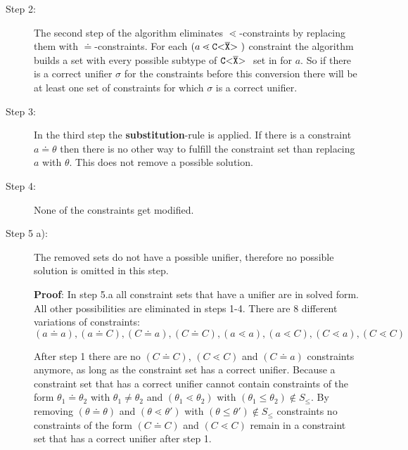\documentclass[acmsmall,screen,review]{acmart}
\begin{document}
\begin{description}
\item[Step 2:]
The second step of the algorithm eliminates $\lessdot$-constraints
by replacing them with $\doteq$-constraints.
For each $(a \lessdot \mathtt{C {\tt <} \overline{X} {\tt >} \ })$ constraint the algorithm builds a set with every
possible subtype of $\mathtt{C {\tt <} \overline{X} {\tt >} \ }$ set in for $a$.
So if there is a correct unifier $\sigma$ for the constraints before this conversion there will be at least one set of
constraints for which $\sigma$ is a correct unifier.

\item[Step 3:]
In the third step the \textbf{substitution}-rule is applied.
If there is a constraint $a \doteq \theta$ then there is no other way to fulfill the constraint set
than replacing $a$ with $\theta$.
This does not remove a possible solution.

\item[Step 4:]
None of the constraints get modified.

\item[Step 5 a):]
The removed sets do not have a possible unifier, therefore no possible solution is
omitted in this step.

\textbf{Proof}:
In step 5.a all constraint sets that have a unifier are in solved form.
All other possibilities are eliminated in steps 1-4.
There are 8 different variations of constraints:\\
$(a \doteq a), (a \doteq C), (C \doteq a), (C \doteq C), (a \lessdot a), (a \lessdot C), (C \lessdot a), (C \lessdot C)$

After step 1 there are no $(C \doteq C)$, $(C \lessdot C)$ and $(C \doteq a)$ constraints anymore,
as long as the constraint set has a correct unifier.
Because a constraint set that has a correct unifier cannot contain constraints of the form $\theta_1 \doteq \theta_2$ with $\theta_1 \neq \theta_2$ and
$(\theta_1 \lessdot \theta_2)$ with $(\theta_1 \leq \theta_2) \notin S_\leq$.
By removing $(\theta \doteq \theta)$ and $(\theta \lessdot \theta')$ with $(\theta \leq \theta') \notin S_\leq$ constraints
no constraints of the form $(C \doteq C)$ and $(C \lessdot C)$
remain in a constraint set that has a correct unifier after step 1.


\end{description}
\end{document}
